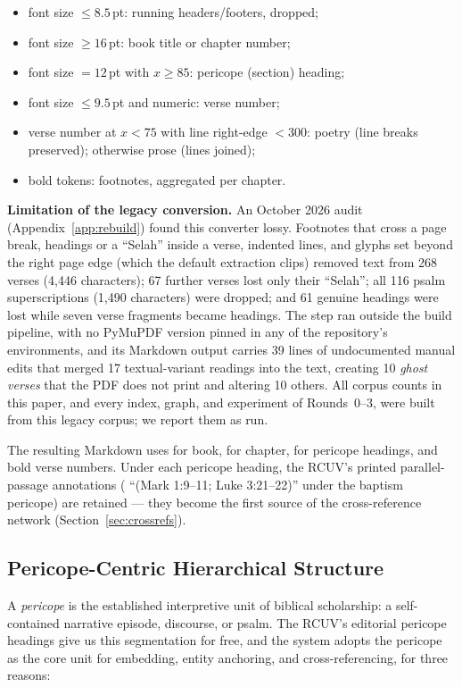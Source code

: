 \begin{itemize}
\item font size $\le 8.5$\,pt: running headers/footers, dropped;
\item font size $\ge 16$\,pt: book title or chapter number;
\item font size $=12$\,pt with $x \ge 85$: pericope (section) heading;
\item font size $\le 9.5$\,pt and numeric: verse number;
\item verse number at $x < 75$ with line right-edge $< 300$: poetry
      (line breaks preserved); otherwise prose (lines joined);
\item bold  tokens: footnotes, aggregated per chapter.
\end{itemize}

\textbf{Limitation of the legacy conversion.} An October 2026 audit
(Appendix~\ref{app:rebuild}) found this converter lossy. Footnotes that
cross a page break, headings or a ``Selah'' inside a verse, indented
lines, and glyphs set beyond the right page edge (which the default
extraction clips)
removed text from 268 verses (4{,}446 characters); 67 further verses lost
only their ``Selah''; all 116 psalm superscriptions (1{,}490 characters)
were dropped; and 61 genuine headings were lost while seven verse
fragments became headings. The step ran outside the build pipeline, with
no PyMuPDF version pinned in any of the repository's environments, and
its Markdown output carries 39 lines of undocumented manual edits that
merged 17 textual-variant readings into the text, creating 10
\emph{ghost verses} that the PDF does not print and altering 10 others.
All corpus counts in this paper, and every index, graph, and experiment
of Rounds~0--3, were built from this legacy corpus; we report them as
run.

The resulting Markdown uses \code{\#} for book, \code{\#\#} for chapter,
\code{\#\#\#} for pericope headings, and bold verse numbers. Under each
pericope heading, the RCUV's printed parallel-passage annotations (\eg
``(Mark 1:9--11; Luke 3:21--22)'' under the baptism pericope) are retained
--- they become the first source of the cross-reference network
(Section~\ref{sec:crossrefs}).

\subsection{Pericope-Centric Hierarchical Structure}
\label{sec:pericope}

A \emph{pericope} is the established interpretive unit of biblical
scholarship: a self-contained narrative episode, discourse, or psalm. The
RCUV's editorial pericope headings give us this segmentation for free, and
the system adopts the pericope as the core unit for embedding, entity
anchoring, and cross-referencing, for three reasons:

